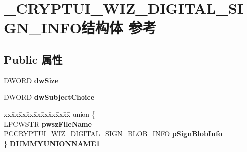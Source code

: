 \hypertarget{struct___c_r_y_p_t_u_i___w_i_z___d_i_g_i_t_a_l___s_i_g_n___i_n_f_o}{}\section{\+\_\+\+C\+R\+Y\+P\+T\+U\+I\+\_\+\+W\+I\+Z\+\_\+\+D\+I\+G\+I\+T\+A\+L\+\_\+\+S\+I\+G\+N\+\_\+\+I\+N\+F\+O结构体 参考}
\label{struct___c_r_y_p_t_u_i___w_i_z___d_i_g_i_t_a_l___s_i_g_n___i_n_f_o}
\subsection*{Public 属性}
\begin{DoxyCompactItemize}
\item 
\mbox{\label{struct___c_r_y_p_t_u_i___w_i_z___d_i_g_i_t_a_l___s_i_g_n___i_n_f_o_a99fdd8c2cccdcac39167f7997eeb11ea}} 
D\+W\+O\+RD {\bfseries dw\+Size}
\item 
\mbox{\label{struct___c_r_y_p_t_u_i___w_i_z___d_i_g_i_t_a_l___s_i_g_n___i_n_f_o_a43d11e1212944ce4b48aefca6ff0e667}} 
D\+W\+O\+RD {\bfseries dw\+Subject\+Choice}
\item 
\mbox{\label{struct___c_r_y_p_t_u_i___w_i_z___d_i_g_i_t_a_l___s_i_g_n___i_n_f_o_a433cef500d8adbe246cdd10cfce7420c}} 
\begin{tabbing}
xx\=xx\=xx\=xx\=xx\=xx\=xx\=xx\=xx\=\kill
union \{\\
\>LPCWSTR {\bfseries pwszFileName}\\
\>\hyperlink{struct___c_r_y_p_t_u_i___w_i_z___d_i_g_i_t_a_l___s_i_g_n___b_l_o_b___i_n_f_o}{PCCRYPTUI\_WIZ\_DIGITAL\_SIGN\_BLOB\_INFO} {\bfseries pSignBlobInfo}\\
\} {\bfseries DUMMYUNIONNAME1}\\


\end{tabbing}
\end{DoxyCompactItemize}
